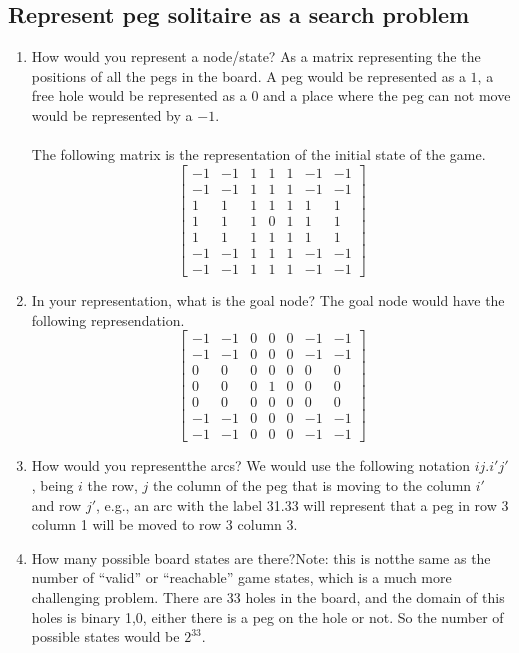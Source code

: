 \documentclass{article}
\def\ans#1{{\color{ans}#1}}
\begin{document}
\subsection{Represent peg solitaire as a search problem}
\begin{enumerate}[label=(\alph*)]
    \item How would you represent a node/state?
    \ans{
        As a matrix representing the the positions of all the pegs in the board. A peg would 
        be represented as a $1$, a free hole would be represented as a $0$ and a place 
        where the peg can not move would be represented by a $-1$.\\ \\ The following matrix 
        is the representation of the initial state of the game.
        \[ \left[ 
        \begin{array}{ccccccc}
        -1 & -1 & 1 & 1 & 1 & -1 & -1 \\
        -1 & -1 & 1 & 1 & 1 & -1 & -1 \\
        1 & 1 & 1 & 1 & 1 & 1 & 1 \\
        1 & 1 & 1 & 0 & 1 & 1 & 1 \\
        1 & 1 & 1 & 1 & 1 & 1 & 1 \\
        -1 & -1 & 1 & 1 & 1 & -1 & -1 \\
        -1 & -1 & 1 & 1 & 1 & -1 & -1 
        \end{array} 
        \right]\] 
    }
    \item In your representation, what is the goal node?
    \ans{
        The goal node would have the following represendation.
        \[ \left[ 
        \begin{array}{ccccccc}
        -1 & -1 & 0 & 0 & 0 & -1 & -1 \\
        -1 & -1 & 0 & 0 & 0 & -1 & -1 \\
        0 & 0 & 0 & 0 & 0 & 0 & 0 \\
        0 & 0 & 0 & 1 & 0 & 0 & 0 \\
        0 & 0 & 0 & 0 & 0 & 0 & 0 \\
        -1 & -1 & 0 & 0 & 0 & -1 & -1 \\
        -1 & -1 & 0 & 0 & 0 & -1 & -1 
        \end{array} 
        \right]\] 
    }
    \item How would you representthe arcs?
    \ans{
        We would use the following notation $ij.i'j'$, being $i$ the row, $j$ the column of 
        the peg that is moving to the column $i'$ and row $j'$, e.g., an arc with the label 
        31.33 will represent that a peg in row 3 column 1 will be moved to row 3 column 3.
    }
    \item How many possible board states are there?Note: this is notthe same as the number of “valid” or “reachable” game states, which is a much more challenging problem.
    \ans{
        There are 33 holes in the board, and the domain of this holes is binary {1,0}, 
        either there is a peg on the hole or not. So the number of possible states would 
        be $2^{33}$.
    }
\end{enumerate}
\end{document}
